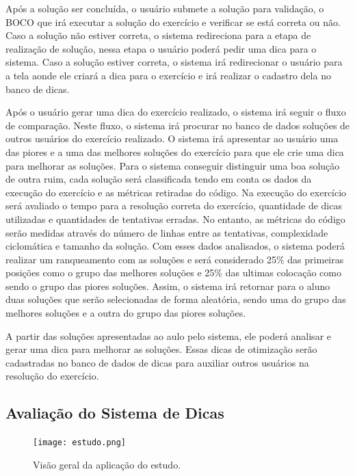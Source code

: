 Após a solução ser concluída, o usuário submete a solução para validação, o BOCO que irá executar a solução do exercício e verificar se está correta ou não. Caso a solução não estiver correta, o sistema redireciona para a etapa de realização de solução, nessa etapa o usuário poderá pedir uma dica para o sistema. Caso a solução estiver correta, o sistema irá redirecionar o usuário para a tela aonde ele criará a dica para o exercício e irá realizar o cadastro dela no banco de dicas.

Após o usuário gerar uma dica do exercício realizado, o sistema irá seguir o fluxo de comparação. Neste fluxo, o sistema irá procurar no banco de dados soluções de outros usuários do exercício realizado. O sistema irá apresentar ao usuário uma das piores e a uma das melhores soluções do exercício para que ele crie uma dica para melhorar as soluções. Para o sistema conseguir distinguir uma boa solução de outra ruim, cada solução será classificada tendo em conta os dados da execução do exercício e as métricas retiradas do código. Na execução do exercício será avaliado o tempo para a resolução correta do exercício, quantidade de dicas utilizadas e quantidades de tentativas erradas. No entanto, as métricas do código serão medidas através do número de linhas entre as tentativas, complexidade ciclomática e tamanho da solução. Com esses dados analisados, o sistema poderá realizar um ranqueamento com as soluções e será considerado 25\% das primeiras posições como o grupo das melhores soluções e 25\% das ultimas colocação como sendo o grupo das piores soluções. Assim, o sistema irá retornar para o aluno duas soluções que serão selecionadas de forma aleatória, sendo uma do grupo das melhores soluções e a outra do grupo das piores soluções.

A partir das soluções apresentadas ao aulo pelo sistema, ele poderá analisar e gerar uma dica para melhorar as soluções. Essas dicas de otimização serão cadastradas no banco de dados de dicas para auxiliar outros usuários na resolução do exercício.

\subsection{Avaliação do Sistema de Dicas}

\begin{figure}[]
	\centering
	\captionsetup{justification=centering}
	\texttt{[image: estudo.png]}
	\caption{Visão geral da aplicação do estudo.}
	\label{figura:estudo}
\end{figure}

